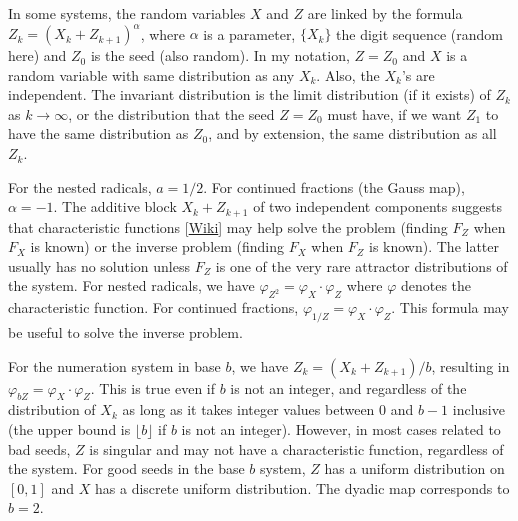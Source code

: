 \documentclass[oneside,10pt]{book}
\begin{document}
In some systems,  the random variables $X$ and $Z$
are linked by the formula $Z_{k} = (X_k +Z_{k+1})^\alpha$, where $\alpha$ is a parameter, $\{X_k\}$ the digit sequence (random here)
 and $Z_0$ is the seed (also random). In my notation, $Z=Z_0$ and $X$ is a random variable with same distribution as any $X_k$.
Also, the $X_k$'s are independent. The \textcolor{index}{invariant distribution} is
 the limit distribution (if it exists) of $Z_k$ as
$k\rightarrow\infty$,
 or the distribution that the seed $Z=Z_0$ must have, if we want $Z_1$ to have the same distribution as $Z_0$, and by extension, the same distribution as all $Z_k$.

For the \textcolor{index}{nested radicals}, $a=1/2$. For continued fractions
(the \textcolor{index}{Gauss map}), $\alpha = -1$. The additive block $X_k + Z_{k+1}$  of two independent components suggests
 that \textcolor{index}{characteristic functions}
 [\href{https://en.wikipedia.org/wiki/Characteristic_function_(probability_theory)}{Wiki}] may help solve the problem (finding $F_Z$ when $F_X$ is known) or
 the inverse problem (finding $F_X$ when $F_Z$ is known). The latter usually has no solution unless
 $F_Z$ is one of the very rare \textcolor{index}{attractor distributions} of the system.
For nested radicals, we have $\varphi_{Z^2} = \varphi_X\cdot \varphi_Z$ where $\varphi$ denotes the characteristic function.
  For continued fractions,
 $\varphi_{1/Z} = \varphi_X\cdot \varphi_Z$. This formula may be useful to solve the inverse problem.

For the numeration system in base $b$,  we have $Z_k = (X_k +Z_{k+1})/b$, resulting
 in $\varphi_{bZ} = \varphi_X \cdot \varphi_Z$. This is true even if $b$ is not an integer, and regardless of the distribution
 of $X_k$ as long as it takes integer values between $0$ and $b-1$ inclusive (the upper bound is $\lfloor b\rfloor$ if $b$ is not an integer).
However, in most cases related to \textcolor{index}{bad seeds}, $Z$ is singular and may not have a characteristic function, regardless of the system.
For good seeds in the base $b$ system, $Z$ has a uniform distribution on $[0, 1]$ and $X$ has a discrete uniform distribution.
The \textcolor{index}{dyadic map} corresponds to $b=2$.
\end{document}
